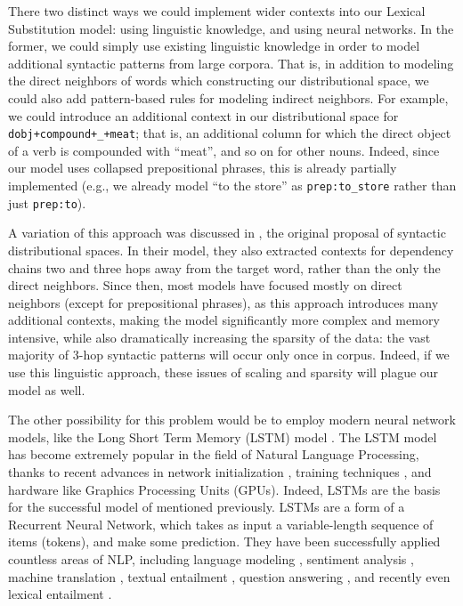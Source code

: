 \documentclass[12pt]{article}
\begin{document}
There two distinct ways we could implement wider contexts into our Lexical
Substitution model: using linguistic knowledge, and using neural networks.
In the former, we could simply use existing linguistic knowledge in order to
model additional syntactic patterns from large corpora. That is, in
addition to modeling the direct neighbors of words which constructing our
distributional space, we could also add pattern-based rules for modeling
indirect neighbors. For example, we could introduce an additional context
in our distributional space for {\tt dobj+compound+\_+meat}; that is, an
additional column for which the direct object of a verb is compounded with
``meat'', and so on for other nouns. Indeed, since our model uses collapsed
prepositional phrases, this is already partially implemented (e.g., we already
model ``to the store'' as {\tt prep:to\_store} rather than just {\tt prep:to}).

A variation of this approach was discussed in , the
original proposal of syntactic distributional spaces. In their model, they also
extracted contexts for dependency chains two and three hops away from the
target word, rather than the only the direct neighbors. Since then, most models
have focused mostly on direct neighbors (except for prepositional phrases), as
this approach introduces many additional contexts, making the model
significantly more complex and memory intensive, while also dramatically
increasing the sparsity of the data: the vast majority of 3-hop syntactic
patterns will occur only once in corpus. Indeed, if we use this linguistic
approach, these issues of scaling and sparsity will plague our model as well.

The other possibility for this problem would be to employ modern neural network
models, like the Long Short Term Memory (LSTM) model \cite{hochreiter:1997:nc}.
The LSTM model has become extremely popular in the field of Natural Language
Processing, thanks to recent advances in network initialization
\cite{glorot:2010:aistats}, training techniques
\cite{duchi:2011:jmlr,kingma:2014:arxiv}, and hardware like Graphics Processing
Units (GPUs). Indeed, LSTMs are the basis for the successful model of
 mentioned previously. LSTMs are a form of a
Recurrent Neural Network, which takes as input a variable-length sequence of
items (tokens), and make some prediction. They have been successfully applied
countless areas of NLP, including language modeling
\cite{sundermeyer:2012:interspeech,jozefowicz:2016:arxiv}, sentiment analysis
\cite{kumar:2016:icml}, machine translation \cite{sutskever:2014:nips},
textual entailment \cite{bowman:2015:emnlp}, question answering
\cite{hermann:2015:nips}, and recently even lexical entailment
\cite{shwartz:2016:acl}.
\end{document}
